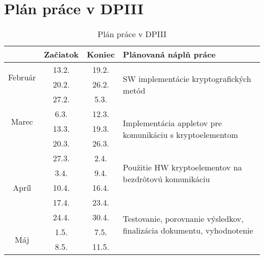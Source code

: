 \documentclass[12pt,a4wide,oneside,openright]{report}
\begin{document}
\addappheadtotoc
\def\appendixname{}
\appendix

\newpage
{}

\chapter{Plán práce v DPIII}
\begin{table}[h]
	\centering
	\caption{Plán práce v DPIII}
	\label{t:plan_prace}
	\noindent\begin{tabular}{|c|c|c|l|}
		\hline
		\multicolumn{1}{|c|}{} & \multicolumn{1}{c|}{Začiatok} & \multicolumn{1}{c|}{Koniec} & {Plánovaná náplň práce} \\ \hline
		\multirow{2}{*}{Február} & 13.2. & 19.2. & \multirow{3}{*}{\parbox{10cm}{SW implementácie kryptografických metód}} \\
		& 20.2. & 26.2. &  \\ \cline{1-3}
		\multirow{4}{*}{Marec} & 27.2. & 5.3. &  \\ \cline{4-4} 
		& 6.3. & 12.3. & \multirow{3}{*}{\parbox{10cm}{Implementácia appletov pre komunikáciu s kryptoelementom}} \\
		& 13.3. & 19.3. &  \\
		& 20.3. & 26.3. &  \\ \hline
		\multirow{5}{*}{Apríl} & 27.3. & 2.4. & \multirow{3}{*}{\parbox{10cm}{Použitie HW  kryptoelementov na bezdrôtovú komunikáciu}} \\
		& 3.4. & 9.4. &  \\
		& 10.4. & 16.4. &  \\ \cline{4-4} 
		& 17.4. & 23.4. & \multirow{4}{*}{\parbox{10cm}{Testovanie, porovnanie výsledkov, finalizácia dokumentu, vyhodnotenie}} \\
		& 24.4. & 30.4. &  \\ \cline{1-3}
		\multirow{2}{*}{Máj} & 1.5. & 7.5. &  \\
		& 8.5. & 11.5. &  \\ \hline
	\end{tabular}
\end{table}

\end{document}
